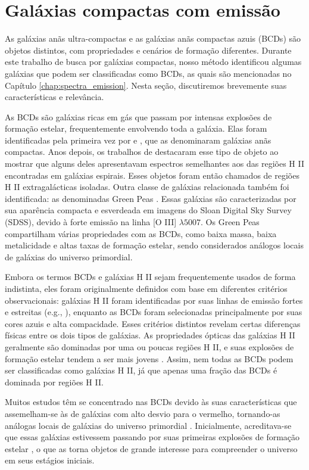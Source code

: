 \section{Galáxias compactas com emissão}\label{sec:galaxias_compactas_emissao}
As galáxias anãs ultra-compactas e as galáxias anãs compactas azuis (BCDs) são objetos distintos, com propriedades e cenários de formação diferentes. Durante este trabalho de busca por galáxias compactas, nosso método identificou algumas galáxias que podem ser classificadas como BCDs, as quais são mencionadas no Capítulo \ref{chap:spectra_emission}. Nesta seção, discutiremos brevemente suas características e relevância.

As BCDs são galáxias ricas em gás que passam por intensas explosões de formação estelar, frequentemente envolvendo toda a galáxia. Elas foram identificadas pela primeira vez por \cite{Hardie_1956} e \cite{Zwicky_1961}, que as denominaram galáxias anãs compactas. Anos depois, os trabalhos de \cite{Sargent_1970} destacaram esse tipo de objeto ao mostrar que alguns deles apresentavam espectros semelhantes aos das regiões H II encontradas em galáxias espirais. Esses objetos foram então chamados de regiões H II extragalácticas isoladas. Outra classe de galáxias relacionada também foi identificada: as denominadas Green Peas \citep{Cardamone_2009}. Essas galáxias são caracterizadas por sua aparência compacta e esverdeada em imagens do Sloan Digital Sky Survey (SDSS), devido à forte emissão na linha [O III] $\lambda5007$. Os Green Peas compartilham várias propriedades com as BCDs, como baixa massa, baixa metalicidade e altas taxas de formação estelar, sendo considerados análogos locais de galáxias do universo primordial.

Embora os termos BCDs e galáxias H II sejam frequentemente usados de forma indistinta, eles foram originalmente definidos com base em diferentes critérios observacionais: galáxias H II foram identificadas por suas linhas de emissão fortes e estreitas (e.g., \citealt{Terlevich_1991}), enquanto as BCDs foram selecionadas principalmente por suas cores azuis e alta compacidade. Esses critérios distintos revelam certas diferenças físicas entre os dois tipos de galáxias. As propriedades ópticas das galáxias H II geralmente são dominadas por uma ou poucas regiões H II, e suas explosões de formação estelar tendem a ser mais jovens \citep{Telles_1995}. Assim, nem todas as BCDs podem ser classificadas como galáxias H II, já que apenas uma fração das BCDs é dominada por regiões H II.

Muitos estudos têm se concentrado nas BCDs devido às suas características que assemelham-se às de galáxias com alto desvio para o vermelho, tornando-as análogas locais de galáxias do universo primordial \citep{Papaderos_2006}. Inicialmente, acreditava-se que essas galáxias estivessem passando por suas primeiras explosões de formação estelar \citep{Searle_1973, Aloisi_1999, Thuan_1999}, o que as torna objetos de grande interesse para compreender o universo em seus estágios iniciais.

